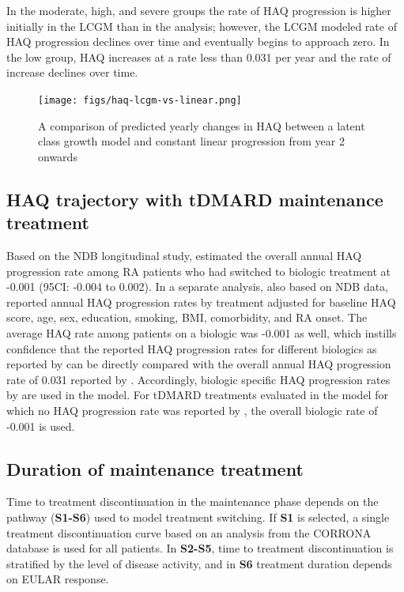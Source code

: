 \documentclass[11pt,final,fleqn]{article}\usepackage[]{graphicx}\usepackage[]{color}
\theoremstyle{plain}
\begin{document}
In the moderate, high, and severe groups the rate of HAQ progression is higher initially in the LCGM than in the \citet{wolfe2010loss} analysis; however, the LCGM modeled rate of HAQ progression declines over time and eventually begins to approach zero. In the low group, HAQ increases at a rate less than 0.031 per year and the rate of increase declines over time. 

\begin{figure}[H]
\centering
\texttt{[image: figs/haq-lcgm-vs-linear.png]}
\caption{A comparison of predicted yearly changes in HAQ between a latent class growth model and constant linear progression from year 2 onwards}\label{fig:lcgm-vs-linear}
\end{figure}

\subsection{HAQ trajectory with tDMARD maintenance treatment}
Based on the NDB longitudinal study, \citet{wolfe2010loss} estimated the overall annual HAQ progression rate among RA patients who had switched to biologic treatment at -0.001 (95CI: -0.004 to 0.002). In a separate analysis, also based on NDB data, \citet{michaud2011treatment} reported annual HAQ progression rates by treatment adjusted for baseline HAQ score, age, sex, education, smoking, BMI, comorbidity, and RA onset. The average HAQ rate among patients on a biologic was -0.001 as well, which instills confidence that the reported HAQ progression rates for different biologics as reported by \citet{michaud2011treatment} can be directly compared with the overall annual HAQ progression rate of 0.031 reported by \citet{wolfe2010loss}. Accordingly, biologic specific HAQ progression rates by \citet{michaud2011treatment} are used in the model. For tDMARD treatments evaluated in the model for which no HAQ progression rate was reported by \citet{michaud2011treatment}, the overall biologic rate of -0.001 is used. 

\subsection{Duration of maintenance treatment}\label{duration-of-maintenance-treatment}
Time to treatment discontinuation in the maintenance phase depends on the pathway (\textbf{S1-S6}) used to model treatment switching. If \textbf{S1} is selected, a single treatment discontinuation curve based on an analysis from the CORRONA database is used for all patients. In \textbf{S2-S5}, time to treatment discontinuation is stratified by the level of disease activity, and in \textbf{S6} treatment duration depends on EULAR response.  
\end{document}
